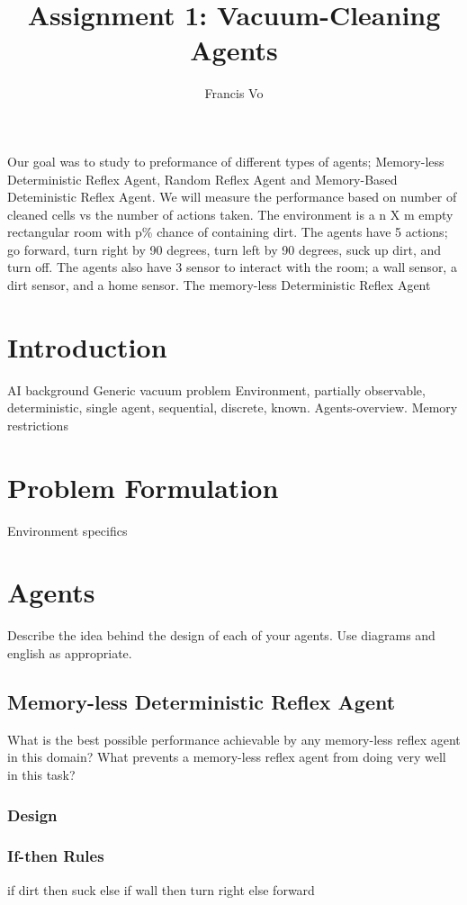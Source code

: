 \documentclass[a4paper,10pt]{article}
\title{Assignment 1: Vacuum-Cleaning Agents}
\author{Francis Vo}
\begin{document}
\maketitle
Our goal was to study to preformance of different types of agents; Memory-less Deterministic Reflex Agent, Random Reflex Agent and Memory-Based Deteministic Reflex Agent.
We will measure the performance based on number of cleaned cells vs the number of actions taken.
The environment is a n X m empty rectangular room with p\% chance of containing dirt.
The agents have 5 actions; go forward, turn right by 90 degrees, turn left by 90 degrees, suck up dirt, and turn off.
The agents also have 3 sensor to interact with the room; a wall sensor, a dirt sensor, and a home sensor.
The memory-less Deterministic Reflex Agent

\section{Introduction}
AI background
Generic vacuum problem
Environment, partially observable, deterministic, single agent, sequential, discrete, known.
Agents-overview. Memory restrictions




\section{Problem Formulation}
Environment specifics

\section{Agents}
Describe the idea behind the design of each of your agents. Use diagrams and english as appropriate.
\subsection{Memory-less Deterministic Reflex Agent}
What is the best possible performance achievable by any memory-less reflex agent in this domain? What prevents a memory-less reflex agent from doing very well in this task?
\subsubsection{Design}
\subsubsection{If-then Rules}
if dirt then suck
else if wall then turn right
else forward
\end{document}
